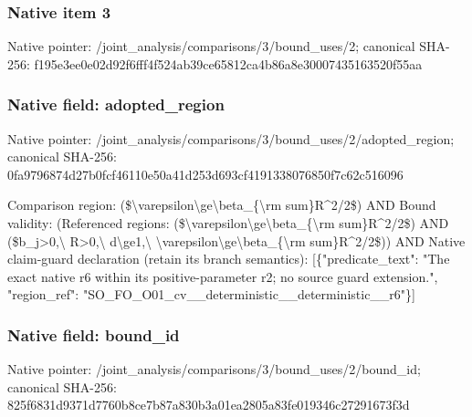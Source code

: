 \documentclass[10pt,a4paper]{article}
\begin{document}
\subsubsection{Native item 3}
Native pointer: /joint\_\allowbreak{}analysis/comparisons/3/bound\_\allowbreak{}uses/2; canonical SHA-256: f195e3ee0e02d92f6fff4f524ab39ce65812ca4b86a8e30007435163520f55aa

\subsubsection{Native field: adopted\_\allowbreak{}region}
Native pointer: /joint\_\allowbreak{}analysis/comparisons/3/bound\_\allowbreak{}uses/2/adopted\_\allowbreak{}region; canonical SHA-256: 0fa9796874d27b0fcf46110e50a41d253d693cf4191338076850f7c62c516096

\begingroup\raggedright\sloppy Comparison region:\allowbreak{} (\$\textbackslash{}varepsilon\textbackslash{}ge\textbackslash{}beta\_\allowbreak{}\{\textbackslash{}rm sum\}R\textasciicircum{}2/\allowbreak{}2\$) AND Bound validity:\allowbreak{} (Referenced regions:\allowbreak{} (\$\textbackslash{}varepsilon\textbackslash{}ge\textbackslash{}beta\_\allowbreak{}\{\textbackslash{}rm sum\}R\textasciicircum{}2/\allowbreak{}2\$) AND (\$b\_\allowbreak{}j>0,\allowbreak{}\textbackslash{} R>0,\allowbreak{}\textbackslash{} d\textbackslash{}ge1,\allowbreak{}\textbackslash{} \textbackslash{}varepsilon\textbackslash{}ge\textbackslash{}beta\_\allowbreak{}\{\textbackslash{}rm sum\}R\textasciicircum{}2/\allowbreak{}2\$)) AND Native claim-guard declaration (retain its branch semantics):\allowbreak{} [\{"predicate\_\allowbreak{}text":\allowbreak{} "The exact native r6 within its positive-parameter r2;\allowbreak{} no source guard extension.",\allowbreak{} "region\_\allowbreak{}ref":\allowbreak{} "SO\_\allowbreak{}FO\_\allowbreak{}O01\_\allowbreak{}cv\_\allowbreak{}\_\allowbreak{}deterministic\_\allowbreak{}\_\allowbreak{}deterministic\_\allowbreak{}\_\allowbreak{}r6"\}]\par\endgroup

\subsubsection{Native field: bound\_\allowbreak{}id}
Native pointer: /joint\_\allowbreak{}analysis/comparisons/3/bound\_\allowbreak{}uses/2/bound\_\allowbreak{}id; canonical SHA-256: 825f6831d9371d7760b8ce7b87a830b3a01ea2805a83fe019346c27291673f3d
\end{document}
